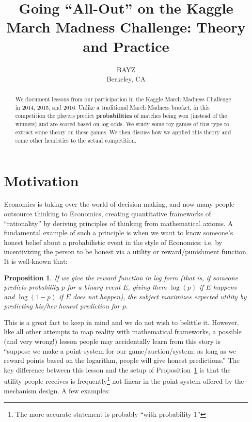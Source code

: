 \documentclass[12pt,twoside,singlespace]{article}
\title{Going ``All-Out'' on the Kaggle March Madness Challenge: Theory and Practice}
\author{BAYZ\\
Berkeley, CA}
\numberwithin{equation}{section}
\newtheorem{prop}[equation]{Proposition}
\theoremstyle{definition}
\begin{document}
\pagestyle{plain}

\maketitle


\begin{abstract}
We document lessons from our participation in the Kaggle March Madness Challenge in 2014, 2015, and 2016. Unlike a traditional March Madness bracket, in this competition the players predict \textbf{probabilities} of matches being won (instead of the winners) and are scored based on log odds. We study some toy games of this type to extract some theory on these games. We then discuss how we applied this theory and some other heuristics to the actual competition. 
\end{abstract}


\section{Motivation}

Economics is taking over the world of decision making, and now many people outsource thinking to Economics, creating quantitative frameworks of ``rationality'' by deriving principles of thinking from mathematical axioms. A fundamental example of such a principle is when we want to know someone's honest belief about a probabilistic event in the style of Economics; i.e. by incentivizing the person to be honest via a utility or reward/punishment function. It is well-known that:

\begin{prop}
\label{prop:log}
If we give the reward function in log form\cite{hansen} (that is, if someone predicts probability $p$ for a binary event $E$, giving them $\log(p)$ if $E$ happens and $\log(1-p)$ if $E$ does not happen), the subject maximizes expected utility by predicting his/her honest prediction for $p$.
\end{prop}

This is a great fact to keep in mind and we do not wish to belittle it. However, like all other attempts to map reality with mathematical frameworks, a possible (and very wrong!) lesson people may accidentally learn from this story is ``suppose we make a point-system for our game/auction/system; as long as we reward points based on the logarithm, people will give honest predictions.'' The key difference between this lesson and the setup of Proposition~\ref{prop:log} is that the utility people receives is frequently\footnote{The more accurate statement is probably ``with probability $1$''} not linear in the point system offered by the mechanism design. A few examples:
\end{document}
